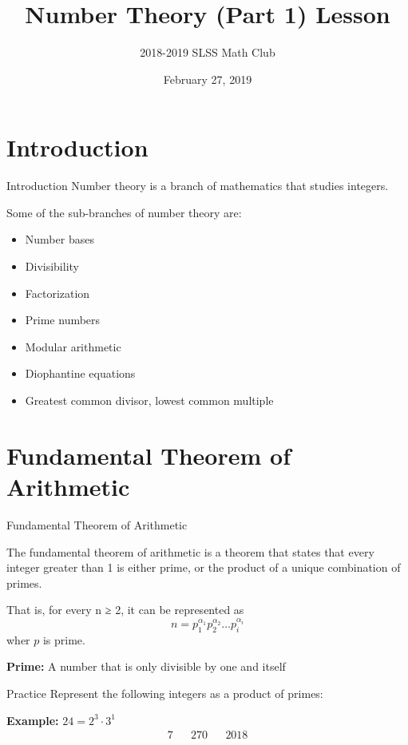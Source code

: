 \documentclass{beamer}
\title{Number Theory (Part 1) Lesson}
\author{2018-2019 SLSS Math Club}
\date{February 27, 2019}
\begin{document}
\frame{\titlepage}

\section{Introduction}
\begin{frame}{Introduction}
     Number theory is a branch of mathematics that studies integers. \newline

    Some of the sub-branches of number theory are:
    \begin{itemize}
        \item Number bases
        \item Divisibility
        \item Factorization 
        \item Prime numbers 
        \item Modular arithmetic
        \item Diophantine equations
        \item Greatest common divisor, lowest common multiple
    \end{itemize}
\end{frame}

\section{Fundamental Theorem of Arithmetic}
\begin{frame}{Fundamental Theorem of Arithmetic}
    
    The fundamental theorem of arithmetic is a theorem that states that every integer greater than 1 is either prime, or the product of a unique combination of primes. \newline
    
    That is, for every n ≥ 2, it can be represented as $$n = p_1^{\alpha_1}p_2^{\alpha_2}\dots p_i^{\alpha_i}$$ wher $p$ is prime. \newline
    
    \textbf{Prime:} A number that is only divisible by one and itself
\end{frame}

\begin{frame}{Practice}
    Represent the following integers as a product of primes: \newline
    
    \textbf{Example:} $24 = 2^3 \cdot 3^1$
    \begin{align*}
        7 && 270 && 2018
    \end{align*}
    
    \vspace{8em}
\end{frame}
\end{document}
